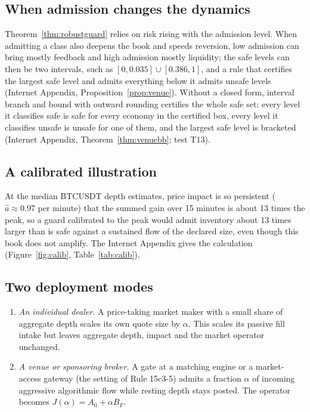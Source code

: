 \documentclass[12pt]{article}
\theoremstyle{definition}
\theoremstyle{remark}
\begin{document}
\subsection{When admission changes the dynamics}\label{sec:venue}
Theorem~\ref{thm:robustguard} relies on risk rising with the admission level. When admitting a class also deepens the book and speeds reversion, low admission can bring mostly feedback and high admission mostly liquidity; the safe levels can then be two intervals, such as $[0,0.035]\cup[0.386,1]$, and a rule that certifies the largest safe level and admits everything below it admits unsafe levels (Internet Appendix, Proposition~\ref{prop:venue}). Without a closed form, interval branch and bound with outward rounding certifies the whole safe set: every level it classifies safe is safe for every economy in the certified box, every level it classifies unsafe is unsafe for one of them, and the largest safe level is bracketed (Internet Appendix, Theorem~\ref{thm:venuebb}; test T13).

\subsection{A calibrated illustration}\label{sec:calib}
At the median BTCUSDT depth estimates, price impact is so persistent ($\hat a\approx0.97$ per minute) that the summed gain over 15 minutes is about 13 times the peak, so a guard calibrated to the peak would admit inventory about 13 times larger than is safe against a sustained flow of the declared size, even though this book does not amplify. The Internet Appendix gives the calculation (Figure~\ref{fig:calib}, Table~\ref{tab:calib}).

\subsection{Two deployment modes}

\begin{enumerate}[label=\textbf{Mode \Alph*.},leftmargin=*]
\item \emph{An individual dealer.} A price-taking market maker with a small share of aggregate depth scales its own quote size by $\alpha$. This scales its passive fill intake but leaves aggregate depth, impact and the market operator unchanged.
\item \emph{A venue or sponsoring broker.} A gate at a matching engine or a market-access gateway (the setting of Rule 15c3-5) admits a fraction $\alpha$ of incoming aggressive algorithmic flow while resting depth stays posted. The operator becomes $J(\alpha)=A_0+\alpha B_F$.
\end{enumerate}
\end{document}
